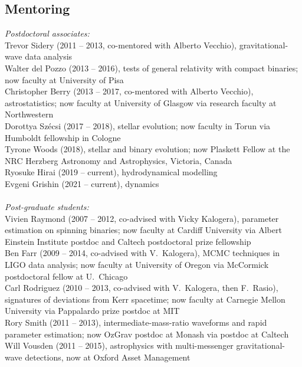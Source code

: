 \documentclass[margin,line]{res}
\begin{document}
\begin{resume}
\section{\sc Mentoring}
{\it Postdoctoral associates:}\\
Trevor Sidery (2011 -- 2013, co-mentored with Alberto Vecchio), gravitational-wave data analysis\\
Walter del Pozzo (2013 -- 2016), tests of general relativity with compact binaries; now faculty at University of Pisa\\
Christopher Berry (2013 -- 2017, co-mentored with Alberto Vecchio), astrostatistics; now faculty at University of Glasgow via research faculty at Northwestern\\
Dorottya Sz\'{e}csi (2017 -- 2018), stellar evolution; now faculty in Torun via Humboldt fellowship in Cologne\\
Tyrone Woods (2018), stellar and binary evolution; now Plaskett Fellow at the NRC Herzberg Astronomy and Astrophysics, Victoria, Canada\\
Ryosuke Hirai (2019 -- current), hydrodynamical modelling\\
Evgeni Grishin (2021 -- current), dynamics\\
\\
{\it Post-graduate students:}\\
Vivien Raymond (2007 -- 2012, co-advised with Vicky Kalogera), parameter estimation on spinning binaries; now faculty at Cardiff University via Albert Einstein Institute postdoc and Caltech postdoctoral prize fellowship\\
Ben Farr (2009 -- 2014, co-advised with V.~Kalogera), MCMC techniques in LIGO data analysis; now faculty at University of Oregon via McCormick postdoctoral fellow at U.~Chicago\\
Carl Rodriguez (2010 -- 2013, co-advised with V.~Kalogera, then F.~Rasio), signatures of deviations from Kerr spacetime; now faculty at Carnegie Mellon University via Pappalardo prize postdoc at MIT\\
Rory Smith (2011 -- 2013), intermediate-mass-ratio waveforms and rapid parameter estimation; now OzGrav postdoc at Monash via postdoc at Caltech\\
Will Vousden (2011 -- 2015), astrophysics with multi-messenger gravitational-wave detections, now at Oxford Asset Management\\

\end{resume}
\end{document}
